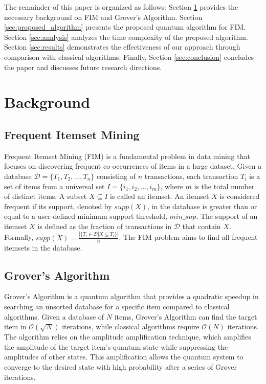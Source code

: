 The remainder of this paper is organized as follows: Section \ref{sec:background} provides the necessary background on FIM and Grover's Algorithm. Section \ref{sec:proposed_algorithm} presents the proposed quantum algorithm for FIM. Section \ref{sec:analysis} analyzes the time complexity of the proposed algorithm. Section \ref{sec:results} demonstrates the effectiveness of our approach through comparison with classical algorithms. Finally, Section \ref{sec:conclusion} concludes the paper and discusses future research directions.

\section{Background}\label{sec:background}

\subsection{Frequent Itemset Mining}

Frequent Itemset Mining (FIM) is a fundamental problem in data mining that focuses on discovering frequent co-occurrences of items in a large dataset. Given a database $\mathcal{D} = \{T_1, T_2, \ldots, T_n\}$ consisting of $n$ transactions, each transaction $T_i$ is a set of items from a universal set $I = \{i_1, i_2, \ldots, i_m\}$, where $m$ is the total number of distinct items. A subset $X \subseteq I$ is called an itemset. An itemset $X$ is considered frequent if its support, denoted by $supp(X)$, in the database is greater than or equal to a user-defined minimum support threshold, $min\_sup$. The support of an itemset $X$ is defined as the fraction of transactions in $\mathcal{D}$ that contain $X$. Formally, $supp(X) = \frac{|\{T_i \in \mathcal{D} | X \subseteq T_i\}|}{n}$. The FIM problem aims to find all frequent itemsets in the database.

\subsection{Grover's Algorithm}

Grover's Algorithm is a quantum algorithm that provides a quadratic speedup in searching an unsorted database for a specific item compared to classical algorithms. Given a database of $N$ items, Grover's Algorithm can find the target item in $\mathcal{O}(\sqrt{N})$ iterations, while classical algorithms require $\mathcal{O}(N)$ iterations. The algorithm relies on the amplitude amplification technique, which amplifies the amplitude of the target item's quantum state while suppressing the amplitudes of other states. This amplification allows the quantum system to converge to the desired state with high probability after a series of Grover iterations.

